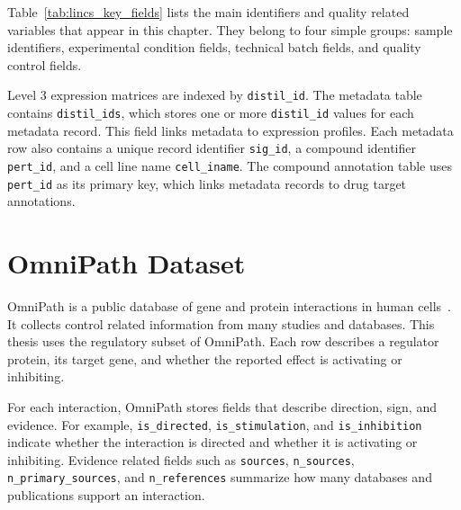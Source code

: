 \noindent Table~\ref{tab:lincs_key_fields} lists the main identifiers and quality related variables that appear in this chapter. They belong to four simple groups: sample identifiers, experimental condition fields, technical batch fields, and quality control fields.

\noindent Level 3 expression matrices are indexed by \texttt{distil\_id}. The metadata table contains \texttt{distil\_ids}, which stores one or more \texttt{distil\_id} values for each metadata record. This field links metadata to expression profiles. Each metadata row also contains a unique record identifier \texttt{sig\_id}, a compound identifier \texttt{pert\_id}, and a cell line name \texttt{cell\_iname}. The compound annotation table uses \texttt{pert\_id} as its primary key, which links metadata records to drug target annotations.




\FloatBarrier
\section{OmniPath Dataset}
\noindent OmniPath is a public database of gene and protein interactions in human cells~\cite{turei2016omnipath}. It collects control related information from many studies and databases. This thesis uses the regulatory subset of OmniPath. Each row describes a regulator protein, its target gene, and whether the reported effect is activating or inhibiting.

\noindent For each interaction, OmniPath stores fields that describe direction, sign, and evidence. For example, \texttt{is\_directed}, \texttt{is\_stimulation}, and \texttt{is\_inhibition} indicate whether the interaction is directed and whether it is activating or inhibiting. Evidence related fields such as \texttt{sources}, \texttt{n\_sources}, \texttt{n\_primary\_sources}, and \texttt{n\_references} summarize how many databases and publications support an interaction.

